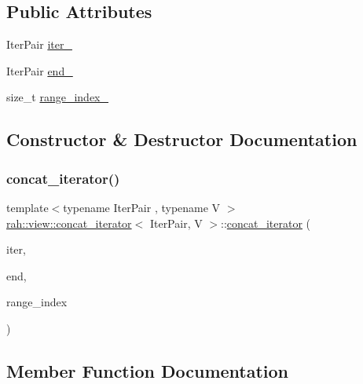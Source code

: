 \subsection*{Public Attributes}
\begin{DoxyCompactItemize}
\item 
Iter\+Pair \mbox{\hyperlink{structrah_1_1view_1_1concat__iterator_affb17b45b66a04b01962c8b84dc20c43}{iter\+\_\+}}
\item 
Iter\+Pair \mbox{\hyperlink{structrah_1_1view_1_1concat__iterator_a98e3cb2e64c68c2a5dd34da03293acea}{end\+\_\+}}
\item 
size\+\_\+t \mbox{\hyperlink{structrah_1_1view_1_1concat__iterator_af57a6e3b1baf3641831378c7919e4256}{range\+\_\+index\+\_\+}}
\end{DoxyCompactItemize}


\subsection{Constructor \& Destructor Documentation}
\mbox{\label{structrah_1_1view_1_1concat__iterator_a45e7ea9b72e7df5390a2ae09a6923d11}} 
\subsubsection{\texorpdfstring{concat\_iterator()}{concat\_iterator()}}
{\footnotesize\ttfamily template$<$typename Iter\+Pair , typename V $>$ \\
\mbox{\hyperlink{structrah_1_1view_1_1concat__iterator}{rah\+::view\+::concat\+\_\+iterator}}$<$ Iter\+Pair, V $>$\+::\mbox{\hyperlink{structrah_1_1view_1_1concat__iterator}{concat\+\_\+iterator}} (\begin{DoxyParamCaption}\item[{Iter\+Pair const \&}]{iter,  }\item[{Iter\+Pair const \&}]{end,  }\item[{size\+\_\+t}]{range\+\_\+index }\end{DoxyParamCaption})\hspace{0.3cm}{\ttfamily [inline]}}



\subsection{Member Function Documentation}
\mbox{\label{structrah_1_1view_1_1concat__iterator_a8449f70baf374fb27f6cf7dbb80e2d17}} 
